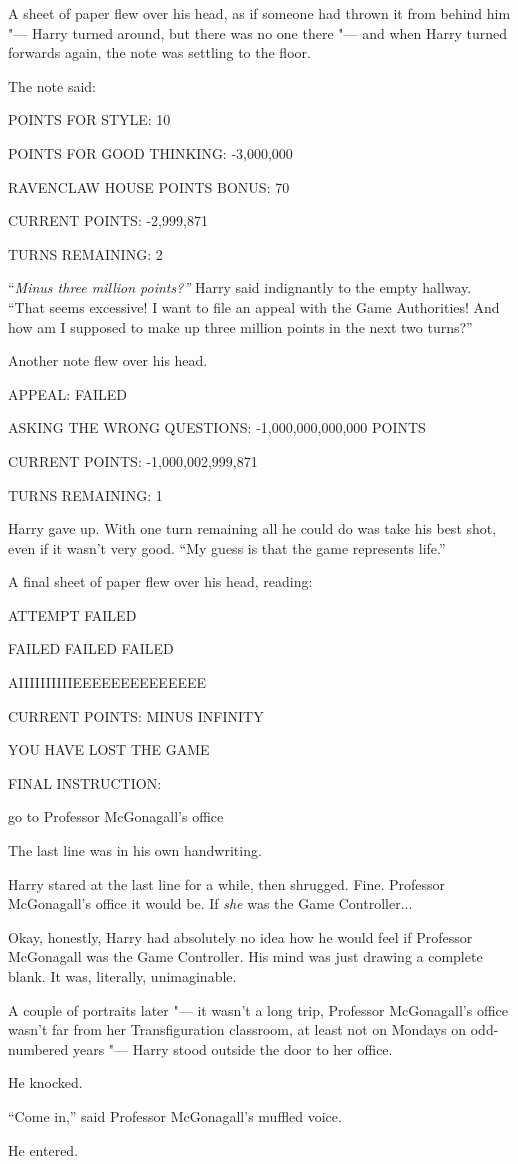 A sheet of paper flew over his head, as if someone had thrown it from
behind him "--- Harry turned around, but there was no one there "--- and when
Harry turned forwards again, the note was settling to the floor.

The note said:

POINTS FOR STYLE: 10

POINTS FOR GOOD THINKING: -3,000,000

RAVENCLAW HOUSE POINTS BONUS: 70

CURRENT POINTS: -2,999,871

TURNS REMAINING: 2

``\emph{Minus three million points?''} Harry said indignantly to the
empty hallway. ``That seems excessive! I want to file an appeal with the
Game Authorities! And how am I supposed to make up three million points
in the next two turns?''

Another note flew over his head.

APPEAL: FAILED

ASKING THE WRONG QUESTIONS: -1,000,000,000,000 POINTS

CURRENT POINTS: -1,000,002,999,871

TURNS REMAINING: 1

Harry gave up. With one turn remaining all he could do was take his best
shot, even if it wasn't very good. ``My guess is that the game
represents life.''

A final sheet of paper flew over his head, reading:

ATTEMPT FAILED

FAILED FAILED FAILED

AIIIIIIIIIIEEEEEEEEEEEEEE

CURRENT POINTS: MINUS INFINITY

YOU HAVE LOST THE GAME

FINAL INSTRUCTION:

go to Professor McGonagall's office

The last line was in his own handwriting.

Harry stared at the last line for a while, then shrugged. Fine.
Professor McGonagall's office it would be. If \emph{she} was the Game
Controller...

Okay, honestly, Harry had absolutely no idea how he would feel if
Professor McGonagall was the Game Controller. His mind was just drawing
a complete blank. It was, literally, unimaginable.

A couple of portraits later "--- it wasn't a long trip, Professor
McGonagall's office wasn't far from her Transfiguration classroom, at
least not on Mondays on odd-numbered years "--- Harry stood outside the
door to her office.

He knocked.

``Come in,'' said Professor McGonagall's muffled voice.

He entered.
